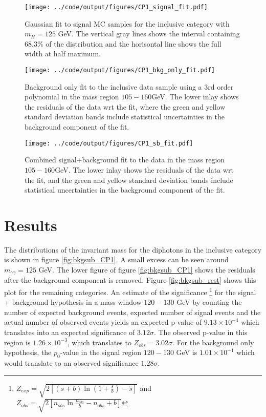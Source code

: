 \documentclass[10pt, aps, twocolumn, a4paper, nofootinbib]{revtex4}
\begin{document}
\begin{figure}
\centering
\texttt{[image: ../code/output/figures/CP1\_signal\_fit.pdf]}
\caption{Gaussian fit to signal MC samples for the inclusive category with $m_H=125$ GeV. The vertical gray lines shows the interval containing $68.3\%$ of the distribution and the horisontal line shows the full width at half maximum. \label{fig:signal_fit_CP1}}
\end{figure}

\begin{figure}
\texttt{[image: ../code/output/figures/CP1\_bkg\_only\_fit.pdf]}
\caption{Background only fit to the inclusive data sample using a 3rd order polynomial in the mass region $105-160$GeV. The lower inlay shows the residuals of the data wrt the fit, where the green and yellow standard deviation bands include statistical uncertainties in the background component of the fit.  \label{fig:bkgonly}}
\end{figure}


\begin{figure}
\centering
\texttt{[image: ../code/output/figures/CP1\_sb\_fit.pdf]}
\caption{Combined signal+background fit to the data in the mass region  $105-160$GeV. The lower inlay shows the residuals of the data wrt the fit, and the green and yellow standard deviation bands include statistical uncertainties in the background component of the fit. \label{fig:signal+bkg}}
\end{figure}


\section{Results}

The distributions of the invariant mass for the diphotons in the inclusive category is shown in figure \ref{fig:bkgsub_CP1}. A small excess can be seen around $m_{\gamma\gamma}= 125$ GeV. The lower figure of figure \ref{fig:bkgsub_CP1} shows the residuals after the background component is removed. Figure \ref{fig:bkgsub_rest} shows this plot for the remaining categories. An estimate of the significance \footnote{$Z_{exp} = \sqrt{2\left[(s+b)\ln\left(1+\frac{s}{b}\right)-s\right]}$ and\\ $Z_{obs}=\sqrt{2\left[n_{obs}\ln\frac{n_{obs}}{b} - n_{obs}+b\right]}$\citep{dataanalysis}} for the signal + background hypothesis in a mass window $120-130$ GeV by counting the number of expected background events, expected number of signal events and the actual number of observed events yields an expected p-value of $9.13\times10^{-4}$ which translates into an expected significance of $3.12\sigma$. The observed p-value in this region is $1.26\times10^{-3}$, which translates to $Z_{obs} = 3.02\sigma$. For the background only hypothesis, the $p_0$-value in the signal region $120-130$ GeV is $1.01\times 10^{-1}$ which would translate to an observed significance $1.28\sigma$.
\end{document}
